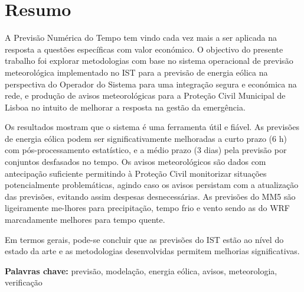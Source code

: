 \chapter{Resumo}\label{sec:resumo} 

A Previsão Numérica do Tempo tem vindo cada vez mais a ser aplicada na resposta a questões específicas com valor económico. O objectivo do presente trabalho foi explorar metodologias com base no sistema operacional de previsão meteorológica implementado no IST para a previsão de energia eólica na perspectiva do Operador do Sistema para uma integração segura e económica na rede, e produção de avisos meteorológicas para a Proteção Civil Municipal de Lisboa no intuito de melhorar a resposta na gestão da emergência.

Os resultados mostram que o sistema é uma ferramenta útil e fiável. As previsões de energia eólica podem ser significativamente melhoradas a curto prazo (6 h) com pós-processamento estatístico, e a médio prazo (3 dias) pela previsão por conjuntos desfasados no tempo. Os avisos meteorológicos são dados com antecipação suficiente permitindo à Proteção Civil monitorizar situações potencialmente problemáticas, agindo caso os avisos persistam com a atualização das previsões, evitando assim despesas desnecessárias. As previsões do MM5 são ligeiramente me-lhores para precipitação, tempo frio e vento sendo as do WRF marcadamente melhores para tempo quente.

Em termos gerais, pode-se concluir que as previsões do IST estão ao nível do estado da arte e as metodologias desenvolvidas permitem melhorias significativas.

\vspace{1.5cm}%

\textbf{Palavras chave:} previsão, modelação, energia eólica, avisos, meteorologia, verificação
